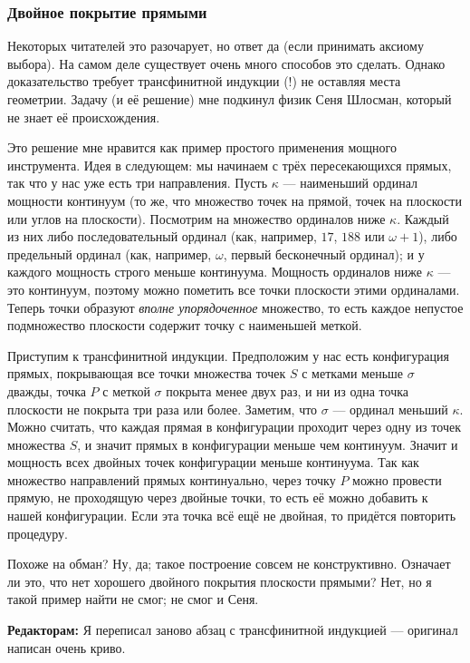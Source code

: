 \subsubsection*{Двойное покрытие прямыми}


Некоторых читателей это разочарует, но ответ да (если принимать аксиому выбора).
На самом деле существует очень много способов это сделать.
Однако доказательство требует трансфинитной индукции (!) не оставляя места геометрии.
Задачу (и её решение) мне подкинул физик Сеня Шлосман, который не знает её происхождения.

Это решение мне нравится как пример простого применения мощного инструмента.
Идея в следующем: мы начинаем с трёх пересекающихся прямых, так что у нас уже есть три направления.
Пусть $\kappa$ --- наименьший ординал мощности континуум (то же, что множество точек на прямой, точек на плоскости или углов на плоскости).
Посмотрим на множество ординалов ниже $\kappa$.
Каждый из них либо последовательный ординал (как, например, $17$, $188$ или $\omega + 1$), либо предельный ординал (как, например, $\omega$, первый бесконечный ординал);
и у каждого мощность строго меньше континуума.
Мощность ординалов ниже $\kappa$ --- это континуум, поэтому можно пометить все точки плоскости этими ординалами. Теперь точки образуют \emph{вполне упорядоченное} множество, то есть каждое непустое подмножество плоскости содержит точку с наименьшей меткой.


Приступим к трансфинитной индукции.
Предположим у нас есть конфигурация прямых, покрывающая все точки множества точек $S$ с метками меньше $\sigma$ дважды,
точка $P$ с меткой $\sigma$ покрыта менее двух раз,
и ни из одна точка плоскости не покрыта три раза или более.
Заметим, что $\sigma$ --- ординал меньший $\kappa$.
Можно считать, что каждая прямая в конфигурации проходит через одну из точек множества $S$, 
и значит прямых в конфигурации меньше чем континуум.
Значит и мощность всех двойных точек конфигурации меньше континуума.
Так как множество направлений прямых континуально, через точку $P$ можно провести прямую, не проходящую через двойные точки,
то есть её можно добавить к нашей конфигурации.
Если эта точка всё ещё не двойная, то придётся повторить процедуру.

Похоже на обман?
Ну, да; такое построение совсем не конструктивно.
Означает ли это, что нет хорошего двойного покрытия плоскости прямыми?
Нет, но я такой пример найти не смог; не смог и Сеня.

\begin{addedbytheeditors}
\textbf{Редакторам:} Я переписал заново абзац с трансфинитной индукцией --- оригинал написан очень криво.
\end{addedbytheeditors}


